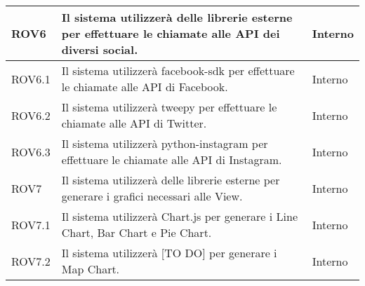 \begin{center}
\begin{longtable}{| p{2.5cm} | p{8cm} | p{2cm} |}
		ROV6  &  Il sistema utilizzerà delle librerie esterne per effettuare le chiamate alle API dei diversi social.  &  Interno \\
		\hline
		ROV6.1  &  Il sistema utilizzerà facebook-sdk per effettuare le chiamate alle API di Facebook.  &  Interno \\
		\hline
		ROV6.2  &  Il sistema utilizzerà tweepy per effettuare le chiamate alle API di Twitter.  &  Interno \\
		\hline
		ROV6.3  &  Il sistema utilizzerà python-instagram per effettuare le chiamate alle API di Instagram.  &  Interno \\
		\hline

		ROV7  &  Il sistema utilizzerà delle librerie esterne per generare i grafici necessari alle View.  &  Interno \\
		\hline
		ROV7.1  &  Il sistema utilizzerà Chart.js per generare i Line Chart, Bar Chart e Pie Chart.  &  Interno \\
		\hline
		ROV7.2  &  Il sistema utilizzerà [TO DO] per generare i Map Chart.  &  Interno \\
		\hline

	\end{longtable}
	\egroup
\end{center}

